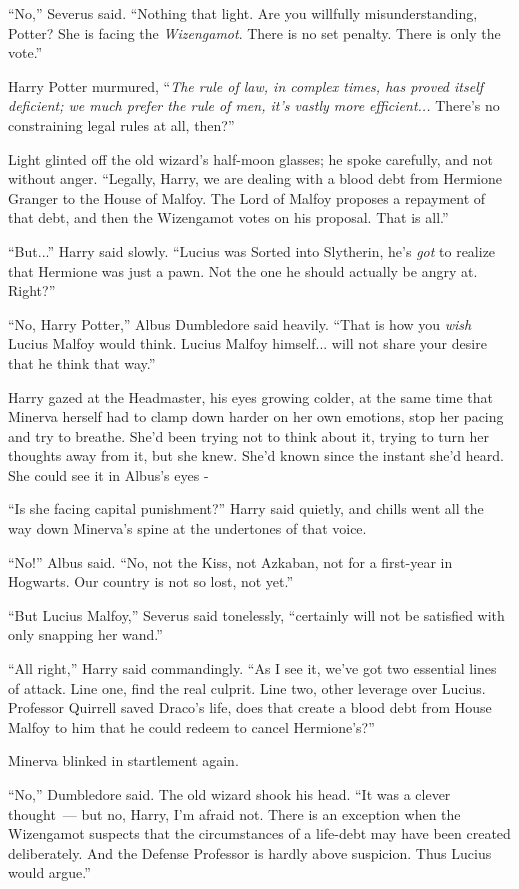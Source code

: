 ``No,'' Severus said. ``Nothing that light. Are you willfully misunderstanding, Potter? She is facing the \emph{Wizengamot}. There is no set penalty. There is only the vote.''

Harry Potter murmured, ``\emph{The rule of law, in complex times, has proved itself deficient; we much prefer the rule of men, it's vastly more efficient...} There's no constraining legal rules at all, then?''

Light glinted off the old wizard's half-moon glasses; he spoke carefully, and not without anger. ``Legally, Harry, we are dealing with a blood debt from Hermione Granger to the House of Malfoy. The Lord of Malfoy proposes a repayment of that debt, and then the Wizengamot votes on his proposal. That is all.''

``But...'' Harry said slowly. ``Lucius was Sorted into Slytherin, he's \emph{got} to realize that Hermione was just a pawn. Not the one he should actually be angry at. Right?''

``No, Harry Potter,'' Albus Dumbledore said heavily. ``That is how you \emph{wish} Lucius Malfoy would think. Lucius Malfoy himself... will not share your desire that he think that way.''

Harry gazed at the Headmaster, his eyes growing colder, at the same time that Minerva herself had to clamp down harder on her own emotions, stop her pacing and try to breathe. She'd been trying not to think about it, trying to turn her thoughts away from it, but she knew. She'd known since the instant she'd heard. She could see it in Albus's eyes -

``Is she facing capital punishment?'' Harry said quietly, and chills went all the way down Minerva's spine at the undertones of that voice.

``No!'' Albus said. ``No, not the Kiss, not Azkaban, not for a first-year in Hogwarts. Our country is not so lost, not yet.''

``But Lucius Malfoy,'' Severus said tonelessly, ``certainly will not be satisfied with only snapping her wand.''

``All right,'' Harry said commandingly. ``As I see it, we've got two essential lines of attack. Line one, find the real culprit. Line two, other leverage over Lucius. Professor Quirrell saved Draco's life, does that create a blood debt from House Malfoy to him that he could redeem to cancel Hermione's?''

Minerva blinked in startlement again.

``No,'' Dumbledore said. The old wizard shook his head. ``It was a clever thought~--- but no, Harry, I'm afraid not. There is an exception when the Wizengamot suspects that the circumstances of a life-debt may have been created deliberately. And the Defense Professor is hardly above suspicion. Thus Lucius would argue.''

